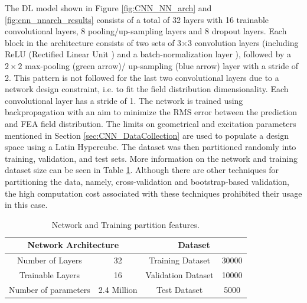 The DL model shown in Figure \ref{fig:CNN_NN_arch} and \ref{fig:cnn_nnarch_results} consists of a total of 32 layers with 16 trainable convolutional layers, 8 pooling/up-sampling layers and 8 dropout layers. Each block in the architecture consists of two sets of 3×3 convolution layers (including ReLU (Rectified Linear Unit \parencite{goodfellow2016deep}) and a batch-normalization layer \parencite{geron2019hands}), followed by a $2 \times 2$ max-pooling \parencite{goodfellow2016deep} (green arrow)/ up-sampling (blue arrow) layer with a stride of 2. This pattern is not followed for the last two convolutional layers due to a network design constraint, i.e. to fit the field distribution dimensionality. Each convolutional layer has a stride of 1. The network is trained using backpropagation with an aim to minimize the RMS error between the prediction and FEA field distribution. The limits on geometrical and excitation parameters mentioned in Section \ref{sec:CNN_DataCollection} are used to populate a design space using a Latin Hypercube. The dataset was then partitioned randomly into training, validation, and test sets. More information on the network and training dataset size can be seen in Table \ref{tab:cnn_nw_train_ds_features}. Although there are other techniques for partitioning the data, namely, cross-validation and bootstrap-based validation, the high computation cost associated with these techniques prohibited their usage in this case.

\begin{table}[]
\centering
\begin{tabular}{||c|c||c|c||}
\hline
\multicolumn{2}{|c|}{\textbf{Network Architecture}} & \multicolumn{2}{c|}{\textbf{Dataset}} \\ \hline \hline
Number of Layers              & 32                  & Training Dataset         & 30000      \\ \hline
Trainable Layers              & 16                  & Validation Dataset       & 10000      \\ \hline
Number of parameters          & 2.4 Million         & Test Dataset             & 5000       \\ \hline
\end{tabular}
\caption{Network and Training partition features.}
\label{tab:cnn_nw_train_ds_features}
\end{table}

